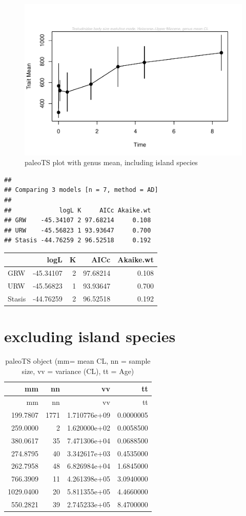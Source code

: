 \documentclass[]{article}
\begin{document}
\begin{figure}[htbp]
\centering
\includegraphics{MA_JJ_files/figure-latex/paleoTS plot with genus mean, including island species-1.pdf}
\caption{paleoTS plot with genus mean, including island species}
\end{figure}

\begin{verbatim}
## 
## Comparing 3 models [n = 7, method = AD]
## 
##             logL K     AICc Akaike.wt
## GRW    -45.34107 2 97.68214     0.108
## URW    -45.56823 1 93.93647     0.700
## Stasis -44.76259 2 96.52518     0.192
\end{verbatim}

\begin{longtable}[]{@{}lrrrr@{}}
\toprule
& logL & K & AICc & Akaike.wt\tabularnewline
\midrule
\endhead
GRW & -45.34107 & 2 & 97.68214 & 0.108\tabularnewline
URW & -45.56823 & 1 & 93.93647 & 0.700\tabularnewline
Stasis & -44.76259 & 2 & 96.52518 & 0.192\tabularnewline
\bottomrule
\end{longtable}

\section{excluding island species}\label{excluding-island-species}

\begin{longtable}[]{@{}rrrr@{}}
\caption{paleoTS object (mm= mean CL, nn = sample size, vv = variance
(CL), tt = Age)}\tabularnewline
\toprule
mm & nn & vv & tt\tabularnewline
\midrule
\endfirsthead
\toprule
mm & nn & vv & tt\tabularnewline
\midrule
\endhead
199.7807 & 1771 & 1.710776e+09 & 0.0000005\tabularnewline
259.0000 & 2 & 1.620000e+02 & 0.0058500\tabularnewline
380.0617 & 35 & 7.471306e+04 & 0.0688500\tabularnewline
274.8795 & 40 & 3.342617e+03 & 0.4535000\tabularnewline
262.7958 & 48 & 6.826984e+04 & 1.6845000\tabularnewline
766.3909 & 11 & 4.261398e+05 & 3.0940000\tabularnewline
1029.0400 & 20 & 5.811355e+05 & 4.4660000\tabularnewline
550.2821 & 39 & 2.745233e+05 & 8.4700000\tabularnewline
\bottomrule
\end{longtable}
\end{document}
